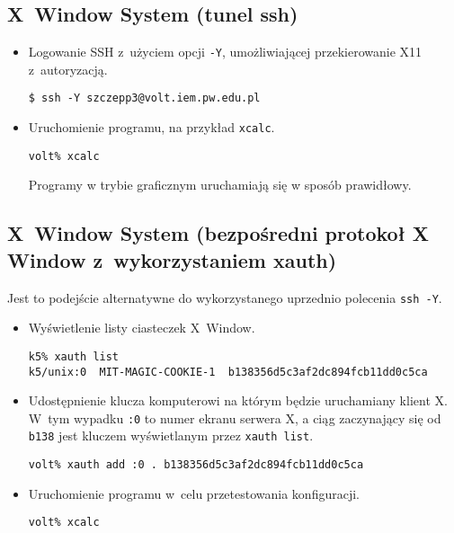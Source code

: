 \documentclass[a4paper,11pt]{article}
\begin{document}
\subsection{X~Window System (tunel ssh)}

\begin{itemize}

\item Logowanie SSH z~użyciem opcji \verb|-Y|, umożliwiającej przekierowanie X11
    z~autoryzacją.

\begin{verbatim}
$ ssh -Y szczepp3@volt.iem.pw.edu.pl
\end{verbatim}

\item Uruchomienie programu, na przykład \verb|xcalc|.

\begin{verbatim}
volt% xcalc
\end{verbatim}

Programy w trybie graficznym uruchamiają się w sposób prawidłowy.

\end{itemize}

\subsection{X~Window System (bezpośredni protokoł X Window z~wykorzystaniem xauth)}
Jest to podejście alternatywne do wykorzystanego uprzednio polecenia \verb|ssh -Y|.
\begin{itemize}

\item Wyświetlenie listy ciasteczek X~Window.

\begin{verbatim}
k5% xauth list
k5/unix:0  MIT-MAGIC-COOKIE-1  b138356d5c3af2dc894fcb11dd0c5ca
\end{verbatim}

\item Udostępnienie klucza komputerowi na którym będzie uruchamiany klient X.
      W~tym wypadku \verb|:0| to numer ekranu serwera X, a ciąg zaczynający
      się od \verb|b138| jest kluczem wyświetlanym przez \verb|xauth list|.

\begin{verbatim}
volt% xauth add :0 . b138356d5c3af2dc894fcb11dd0c5ca
\end{verbatim}

\item Uruchomienie programu w~celu przetestowania konfiguracji.

\begin{verbatim}
volt% xcalc
\end{verbatim}

\end{itemize}
\end{document}
